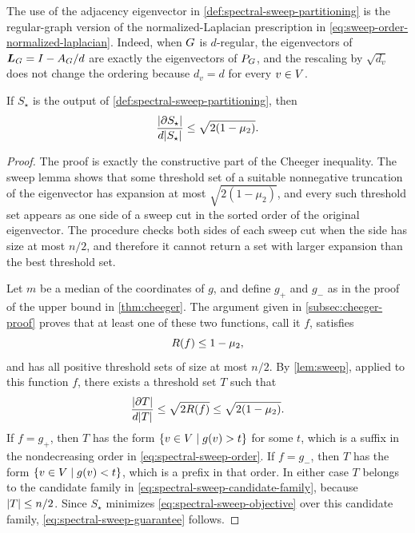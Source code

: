 The use of the adjacency eigenvector in \cref{def:spectral-sweep-partitioning} is the regular-graph version of the normalized-Laplacian prescription in \cref{eq:sweep-order-normalized-laplacian}. Indeed, when \(G\) is \(d\)-regular, the eigenvectors of \(\boldsymbol{L}_{G}=I-A_{G}/d\) are exactly the eigenvectors of \(P_{G}\), and the rescaling by \(\sqrt{d_v}\) does not change the ordering because \(d_v=d\) for every \(v\in V\).

\begin{proposition}
	\label{prop:spectral-sweep-guarantee}
	If \(S_\star\) is the output of \cref{def:spectral-sweep-partitioning}, then
	\begin{equation}
		\label{eq:spectral-sweep-guarantee}
		\frac{\lvert\partial S_\star\rvert}{d\lvert S_\star\rvert}\leq \sqrt{2(1-\mu_2)}.
	\end{equation}
\end{proposition}

\begin{proof}
	The proof is exactly the constructive part of the Cheeger inequality. The sweep lemma shows that some threshold set of a suitable nonnegative truncation of the eigenvector has expansion at most \(\sqrt{2(1-\mu_2)}\), and every such threshold set appears as one side of a sweep cut in the sorted order of the original eigenvector. The procedure checks both sides of each sweep cut when the side has size at most \(n/2\), and therefore it cannot return a set with larger expansion than the best threshold set.

	Let \(m\) be a median of the coordinates of \(g\), and define \(g_+\) and \(g_-\) as in the proof of the upper bound in \cref{thm:cheeger}. The argument given in \cref{subsec:cheeger-proof} proves that at least one of these two functions, call it \(f\), satisfies
	\begin{equation}
		\label{eq:spectral-sweep-truncation-rayleigh}
		R(f)\leq 1-\mu_2,
	\end{equation}
	and has all positive threshold sets of size at most \(n/2\). By \cref{lem:sweep}, applied to this function \(f\), there exists a threshold set \(T\) such that
	\begin{equation}
		\label{eq:spectral-sweep-threshold-bound}
		\frac{\lvert\partial T\rvert}{d\lvert T\rvert}\leq \sqrt{2R(f)}\leq \sqrt{2(1-\mu_2)}.
	\end{equation}
	If \(f=g_+\), then \(T\) has the form \(\{v\in V\mid g(v)>t\}\) for some \(t\), which is a suffix in the nondecreasing order in \cref{eq:spectral-sweep-order}. If \(f=g_-\), then \(T\) has the form \(\{v\in V\mid g(v)<t\}\), which is a prefix in that order. In either case \(T\) belongs to the candidate family in \cref{eq:spectral-sweep-candidate-family}, because \(\lvert T\rvert\leq n/2\). Since \(S_\star\) minimizes \cref{eq:spectral-sweep-objective} over this candidate family, \cref{eq:spectral-sweep-guarantee} follows.
\end{proof}

